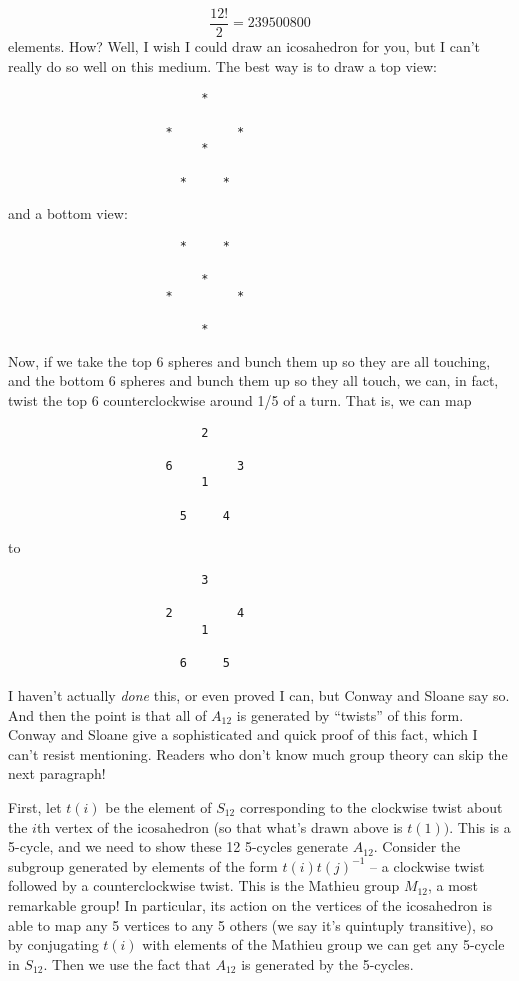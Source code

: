 \[ \frac{12!}{2} = 239500800\]
elements. How? Well, I wish I could draw an icosahedron for you, but I can't really do so well on this medium. The best way is to draw a top view:
\begin{verbatim}
                           *
 
                      *         *
                           *
                        
                        *     *
\end{verbatim}
and a bottom view:
\begin{verbatim}
                        *     *

                           *
                      *         *  
                    
                           *
\end{verbatim}
Now, if we take the top 6 spheres and bunch them up so they are all touching, and the bottom 6 spheres and bunch them up so they all touch, we can, in fact, twist the top 6 counterclockwise around 1/5 of a turn. That is, we can map
\begin{verbatim}
                           2
 
                      6         3
                           1
                        
                        5     4
\end{verbatim}
to
\begin{verbatim}
                           3
 
                      2         4
                           1
                        
                        6     5
\end{verbatim}

I haven't actually \emph{done} this, or even proved I can, but Conway and Sloane say so. And then the point is that all of $A_{12}$ is generated by ``twists'' of this form. Conway and Sloane give a sophisticated and quick proof of this fact, which I can't resist mentioning. Readers who don't know much group theory can skip the next paragraph!

First, let $t(i)$ be the element of $S_{12}$ corresponding to the clockwise twist about the $i$th vertex of the icosahedron (so that what's drawn above is $t(1))$. This is a 5-cycle, and we need to show these 12 5-cycles generate $A_{12}$. Consider the subgroup generated by elements of the form $t(i)t(j)^{-1}$ -- a clockwise twist followed by a counterclockwise twist. This is the Mathieu group $M_{12}$, a most remarkable group! In particular, its action on the vertices of the icosahedron is able to map any 5 vertices to any 5 others (we say it's quintuply transitive), so by conjugating $t(i)$ with elements of the Mathieu group we can get any 5-cycle in $S_{12}$. Then we use the fact that $A_{12}$ is generated by the 5-cycles.

